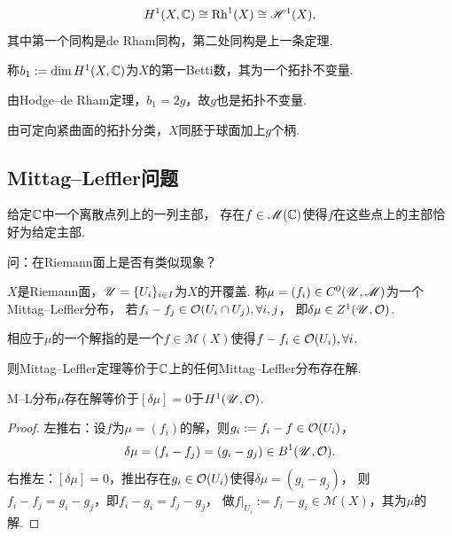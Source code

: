 \begin{theorem}
	$$H^1(X,\mathbb{C})\cong \operatorname{Rh}^1(X) \cong \mathscr{H}^1(X),$$
	其中第一个同构是de Rham同构，第二处同构是上一条定理. 
\end{theorem}
		
\begin{definition}
	称$b_1:=\dim H^1(X,\mathbb{C})$为$X$的第一Betti数，其为一个拓扑不变量.
\end{definition}
		
\begin{remark}
	由Hodge--de Rham定理，$b_1=2g$，故$g$也是拓扑不变量.
\end{remark}

\begin{remark}
	由可定向紧曲面的拓扑分类，$X$同胚于球面加上$g$个柄.
\end{remark}
		

\subsection{Mittag--Leffler问题}

\begin{theorem}
	给定$\mathbb{C}$中一个离散点列上的一列主部，
    存在$f\in \mathscr{M}(\mathbb{C})$使得$f$在这些点上的主部恰好为给定主部.
\end{theorem}

问：在Riemann面上是否有类似现象？

\begin{definition}
	$X$是Riemann面，$\mathscr{U}=\{U_i\}_{i\in I}$为$X$的开覆盖. 
    称$\mu=(f_i)\in C^0(\mathscr{U}, \mathscr{M})$为一个Mittag--Leffler分布，
    若$f_i-f_j \in \mathcal{O}(U_i\cap U_j), \forall i,j$，
    即$\delta \mu \in Z^1(\mathscr{U}, \mathcal{O})$.

	相应于$\mu$的一个解指的是一个$f\in \mathscr{M}(X)$使得$f-f_i\in \mathcal{O}(U_i), \forall i$.
\end{definition}

\begin{remark}
	则Mittag--Leffler定理等价于$\mathbb{C}$上的任何Mittag--Leffler分布存在解.
\end{remark}

\begin{theorem}
	M--L分布$\mu$存在解等价于$[\delta \mu]=0$于$H^1(\mathscr{U},\mathcal{O})$.
\end{theorem}

\begin{proof} 左推右：设$f$为$\mu=(f_i)$的解，则$g_i:=f_i-f\in \mathcal{O}(U_i)$，
	$$\delta \mu=(f_i-f_j)=(g_i-g_j)\in B^1(\mathscr{U},\mathcal{O}).$$
	右推左：$[\delta \mu]=0$，推出存在$g_i\in \mathcal{O}(U_i)$使得$\delta \mu=(g_i-g_j)$，
    则$f_i-f_j=g_i-g_j$，即$f_i-g_i=f_j-g_j$，
    做$f|_{U_i}:=f_i-g_i \in \mathscr{M}(X)$，其为$\mu$的解.
\end{proof}

